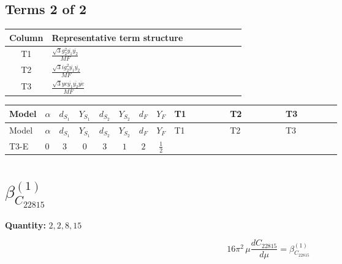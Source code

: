 \documentclass[8pt]{article}
\begin{document}
\begin{landscape}
\subsection*{Terms 2 of 2}
\begin{center}
\begin{tabular}{@{}c >{\raggedright\arraybackslash}p{0.82\linewidth}@{}}
\toprule
Column & Representative term structure \\
\midrule
T1 & \(\displaystyle \frac{\sqrt{3} g_{2}^{2} \overline{y_{1}} \overline{y_{2}}}{MF}\) \\
\midrule
T2 & \(\displaystyle \frac{\sqrt{3} i g_{2}^{2} \overline{y_{1}} \overline{y_{2}}}{MF}\) \\
\midrule
T3 & \(\displaystyle \frac{\sqrt{3} ye \overline{y_{1}} \overline{y_{2}} \overline{ye}}{MF}\) \\
\midrule
\bottomrule
\end{tabular}
\end{center}
\smallskip
\tiny
\begin{longtable}{@{}llcccccc >{\raggedright\arraybackslash}p{0.21\linewidth} >{\raggedright\arraybackslash}p{0.21\linewidth} >{\raggedright\arraybackslash}p{0.21\linewidth}@{}}
\toprule
Model & $\alpha$ & $d_{S_1}$ & $Y_{S_1}$ & $d_{S_2}$ & $Y_{S_2}$ & $d_F$ & $Y_F$ & T1 & T2 & T3 \\
\midrule
\endfirsthead
\toprule
Model & $\alpha$ & $d_{S_1}$ & $Y_{S_1}$ & $d_{S_2}$ & $Y_{S_2}$ & $d_F$ & $Y_F$ & T1 & T2 & T3 \\
\midrule
\endhead
T3-E & $0$ & $3$ & $0$ & $3$ & $1$ & $2$ & $\frac{1}{2}$ & \scriptsize\adjustbox{max width=\linewidth}{$\begin{gathered} \frac{11 \sqrt{3} g_{2}^{2} \overline{y_{1}} \overline{y_{2}}}{8 MF}\end{gathered}$} & \scriptsize\adjustbox{max width=\linewidth}{$\begin{gathered} - \frac{\sqrt{3} i g_{2}^{2} \overline{y_{1}} \overline{y_{2}}}{6 MF}\end{gathered}$} & \scriptsize\adjustbox{max width=\linewidth}{$\begin{gathered} - \frac{\sqrt{3} ye \overline{y_{1}} \overline{y_{2}} \overline{ye}}{12 MF}\end{gathered}$} \\
\midrule
\bottomrule
\end{longtable}
\clearpage
\section*{$\beta_{C_{22815}}^{(1)}$}
\noindent\textbf{Quantity: }$\mathrm{2,2,8,15}$\par\smallskip
\[16\pi^2\,\mu\frac{d C_{22815}}{d\mu}=\beta_{C_{22815}}^{(1)}\]

\end{landscape}
\end{document}
